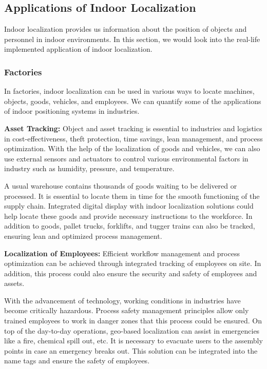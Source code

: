 \documentclass[a4paper,singleside,12pt]{report} %
\begin{document}
			\subsection{Applications of Indoor Localization}


Indoor localization provides us information about the position of objects and personnel in indoor environments. In this section, we would look into the real-life implemented application of indoor localization.

				\subsubsection{Factories}

					In factories, indoor localization can be used in various ways to locate machines, objects, goods, vehicles, and employees. 
					We can quantify some of the applications of indoor positioning systems in industries.

				\textbf{Asset Tracking:} 
				Object and asset tracking is essential to industries and logistics in cost-effectiveness, theft protection, time savings, lean management, and process optimization. 
				With the help of the localization of goods and vehicles, we can also use external sensors and actuators to control various environmental factors in industry such as humidity, pressure, and temperature. 

				A usual warehouse contains thousands of goods waiting to be delivered or processed. It is essential to locate them in time for the smooth functioning of the supply chain. 
				Integrated digital display with indoor localization solutions could help locate these goods and provide necessary instructions to the workforce. 
				In addition to goods, pallet trucks, forklifts, and tugger trains can also be tracked, ensuring lean and optimized process management.
								
				 \textbf{Localization of Employees:}
				Efficient workflow management and process optimization can be achieved through integrated tracking of employees on site. 
				In addition, this process could also ensure the security and safety of employees and assets. 

				With the advancement of technology, working conditions in industries have become critically hazardous. 
				Process safety management principles allow only trained employees to work in danger zones that this process could be ensured. 
				On top of the day-to-day operations, geo-based localization can assist in emergencies like a fire, chemical spill out, etc. It is necessary to evacuate users to the assembly points in case an emergency breaks out. 
				This solution can be integrated into the name tags and ensure the safety of employees.
 
\end{document}

